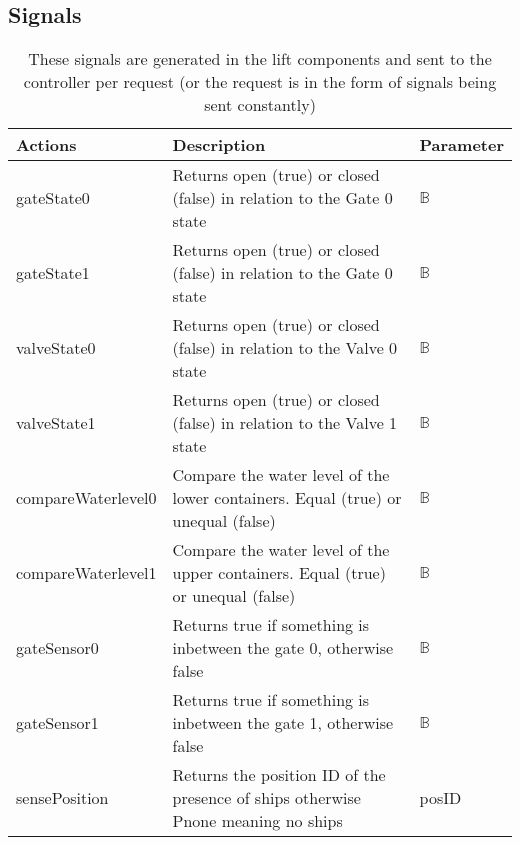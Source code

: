 		
		\subsection{Signals}
		\begin{table}[htbp]
			\centering
			\caption{These signals are generated in the lift components and sent to the controller per request (or the request is in the form of signals being sent constantly)}
			\begin{tabular}{lp{6cm}l}
				\toprule
				\textbf{Actions} & \textbf{Description} & \textbf{Parameter} \\
				\hline
				gateState0 & Returns open (true) or closed (false) in relation to the Gate 0 state &  $ \mathbb{B} $ \\
				gateState1 & Returns open (true) or closed (false) in relation to the Gate 0 state &  $ \mathbb{B} $ \\
				valveState0 & Returns open (true) or closed (false) in relation to the Valve 0 state &  $ \mathbb{B} $ \\
				valveState1 & Returns open (true) or closed (false) in relation to the Valve 1 state &  $ \mathbb{B} $ \\
				compareWaterlevel0 & Compare the water level of the lower containers. Equal (true) or unequal (false) &  $ \mathbb{B} $ \\
				compareWaterlevel1 & Compare the water level of the upper containers. Equal (true) or unequal (false) &  $ \mathbb{B} $ \\
				gateSensor0 &  Returns true if something is inbetween the gate 0, otherwise false &  $ \mathbb{B} $ \\
				gateSensor1 &  Returns true if something is inbetween the gate 1, otherwise false &  $ \mathbb{B} $ \\
				sensePosition  & Returns the position ID of the presence of ships otherwise Pnone meaning no ships & posID \\
				\bottomrule
			\end{tabular}%
				\label{tab:addlabel}%
				\end{table}%
	
			
			

